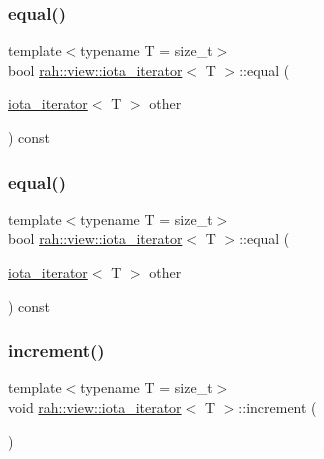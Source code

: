 \subsubsection{\texorpdfstring{equal()}{equal()}\hspace{0.1cm}{\footnotesize\ttfamily [1/2]}}
{\footnotesize\ttfamily template$<$typename T  = size\+\_\+t$>$ \\
bool \mbox{\hyperlink{structrah_1_1view_1_1iota__iterator}{rah\+::view\+::iota\+\_\+iterator}}$<$ T $>$\+::equal (\begin{DoxyParamCaption}\item[{\mbox{\hyperlink{structrah_1_1view_1_1iota__iterator}{iota\+\_\+iterator}}$<$ T $>$}]{other }\end{DoxyParamCaption}) const\hspace{0.3cm}{\ttfamily [inline]}}

\mbox{\label{structrah_1_1view_1_1iota__iterator_ada1691e363efa9b5c945a302296e63d5}} 
\subsubsection{\texorpdfstring{equal()}{equal()}\hspace{0.1cm}{\footnotesize\ttfamily [2/2]}}
{\footnotesize\ttfamily template$<$typename T  = size\+\_\+t$>$ \\
bool \mbox{\hyperlink{structrah_1_1view_1_1iota__iterator}{rah\+::view\+::iota\+\_\+iterator}}$<$ T $>$\+::equal (\begin{DoxyParamCaption}\item[{\mbox{\hyperlink{structrah_1_1view_1_1iota__iterator}{iota\+\_\+iterator}}$<$ T $>$}]{other }\end{DoxyParamCaption}) const\hspace{0.3cm}{\ttfamily [inline]}}

\mbox{\label{structrah_1_1view_1_1iota__iterator_a52be6587654c9783137bf31d800f315d}} 
\subsubsection{\texorpdfstring{increment()}{increment()}\hspace{0.1cm}{\footnotesize\ttfamily [1/2]}}
{\footnotesize\ttfamily template$<$typename T  = size\+\_\+t$>$ \\
void \mbox{\hyperlink{structrah_1_1view_1_1iota__iterator}{rah\+::view\+::iota\+\_\+iterator}}$<$ T $>$\+::increment (\begin{DoxyParamCaption}{ }\end{DoxyParamCaption})\hspace{0.3cm}{\ttfamily [inline]}}

